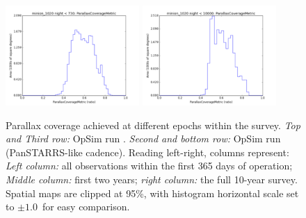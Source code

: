 \begin{figure}[ht]
\begin{center}
  \includegraphics[width=2.0in]{./figs/milkyway/astromPanels/MW_Astrom_paCovge_PanSTARRS_02y_hst.png}
  \includegraphics[width=2.0in]{./figs/milkyway/astromPanels/MW_Astrom_paCovge_PanSTARRS_10y_hst.png}
  \end{center}
  \caption{Parallax coverage achieved at different epochs within the survey. {\it Top and Third row:} OpSim run . {\it Second and bottom row:} OpSim run  (PanSTARRS-like cadence). Reading left-right, columns represent: {\it Left column:} all observations within the first 365 days of operation; {\it Middle column:} first two years; {\it right column:} the full 10-year survey. Spatial maps are clipped at 95\%, with histogram horizontal scale set to $\pm 1.0$~for easy comparison.}
  \label{fig_astrom_ByTime_PACoverage}
\end{figure}

